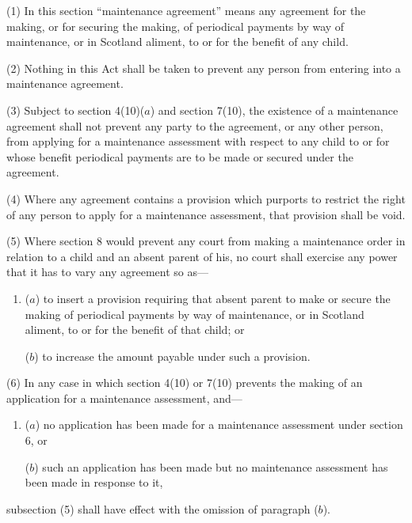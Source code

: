 \documentclass[12pt,a4paper]{article}
\begin{document}
(1) In this section “maintenance agreement” means any agreement for the making, or for securing the making, of periodical payments by way of maintenance, or in Scotland aliment, to or for the benefit of any child.

(2) Nothing in this Act shall be taken to prevent any person from entering into a maintenance agreement.

(3) 
Subject to section 4(10)($a$) and section 7(10),  %
the existence of a maintenance agreement shall not prevent any party to the agreement, or any other person, from applying for a maintenance assessment with respect to any child to or for whose benefit periodical payments are to be made or secured under the agreement.

(4) Where any agreement contains a provision which purports to restrict the right of any person to apply for a maintenance assessment, that provision shall be void.

(5) Where section 8 would prevent any court from making a maintenance order in relation to a child and an absent parent of his, no court shall exercise any power that it has to vary any agreement so as—
\begin{enumerate}\item[]
($a$) to insert a provision requiring that absent parent to make or secure the making of periodical payments by way of maintenance, or in Scotland aliment, to or for the benefit of that child; or

($b$) to increase the amount payable under such a provision.
\end{enumerate}

(6) In any case in which section 4(10) or 7(10) prevents the making of an application for a maintenance assessment, and—
\begin{enumerate}\item[]
($a$) no application has been made for a maintenance assessment under section 6, or

($b$) such an application has been made but no maintenance assessment has been made in response to it,
\end{enumerate}
subsection (5) shall have effect with the omission of paragraph ($b$).

\end{document}
